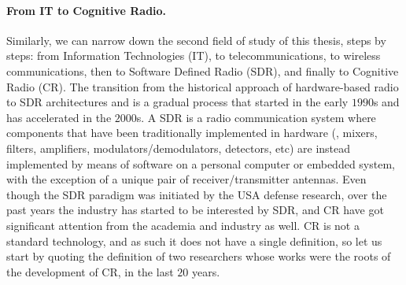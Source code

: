 \paragraph{From IT to Cognitive Radio.}
%
Similarly, we can narrow down the second field of study of this thesis, steps by steps:
from Information Technologies (IT), to telecommunications, to wireless communications, then to Software Defined Radio (SDR),
and finally to Cognitive Radio (CR).
%
The transition from the historical approach of hardware-based radio to SDR architectures and is a gradual process that started in the early $1990$s and has accelerated in the $2000$s.
A SDR is a radio communication system where components that have been traditionally implemented in hardware (\eg, mixers, filters, amplifiers, modulators/demodulators, detectors, etc) are instead implemented by means of software on a personal computer or embedded system, with the exception of a unique pair of receiver/transmitter antennas.
Even though the SDR paradigm was initiated by the USA defense research, over the past years the industry has started to be interested by SDR, and CR have got significant attention from the academia and industry as well.
%
CR is not a standard technology, and as such it does not have a single definition, so let us start by quoting the definition of two researchers whose works were the roots of the development of CR, in the last $20$ years.
%
